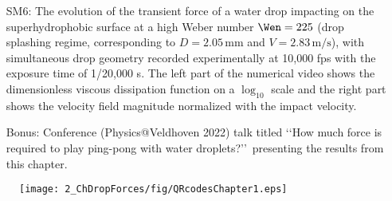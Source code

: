 \begin{subappendices}
\begin{enumerate}
		\item[SM6:] The evolution of the transient force of a water drop impacting on the superhydrophobic surface at a high Weber number $\Wen = 225$ (drop splashing regime, corresponding to $D = 2.05\,\si{\milli\meter}$ and $V = 2.83\,\si{\meter}/\si{\second}$), with simultaneous drop geometry recorded experimentally at 10,000 fps with the exposure time of 1/20,000 s. The left part of the numerical video shows the dimensionless viscous dissipation function on a $\log_{10}$ scale and the right part shows the velocity field magnitude normalized with the impact velocity.
		\item[Bonus:] Conference (Physics@Veldhoven 2022) talk titled \lq\lq How much force is required to play ping-pong with water droplets?\rq\rq\, presenting the results from this chapter. 
	\end{enumerate}

	\begin{figure*}
		\centering
		\texttt{[image: 2\_ChDropForces/fig/QRcodesChapter1.eps]}
	\end{figure*}

\end{subappendices}